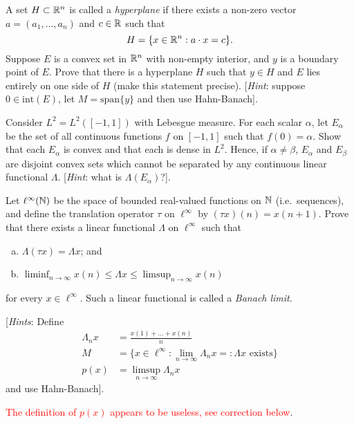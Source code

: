 \begin{exercise}
	A set $H \subset \mathbb{R}^n$ is called a \emph{hyperplane} if there exists a non-zero vector $a = (a_1, \ldots, a_n)$ and $c \in \mathbb{R}$ such that
	\begin{equation*}
		H = \{ x \in \mathbb{R}^n : a \cdot x = c\}.
	\end{equation*}
	Suppose $E$ is a convex set in $\mathbb{R}^n$ with non-empty interior, and $y$ is a boundary point of $E$. Prove that there is a hyperplane $H$ such that $y\in H$ and $E$ lies entirely on one side of $H$ (make this statement precise). [\emph{Hint}: suppose $0 \in \text{int}(E)$, let $M = \text{span}\{y\}$ and then use Hahn-Banach].
\end{exercise}

\begin{exercise}
	Consider $L^2 = L^2([-1,1])$ with Lebesgue measure. For each scalar $\alpha$, let $E_\alpha$ be the set of all continuous functions $f$ on $[-1,1]$ such that $f(0) = \alpha$. Show that each $E_\alpha$ is convex and that each is dense in $L^2$. Hence, if $\alpha \ne \beta$, $E_\alpha$ and $E_\beta$ are disjoint convex sets which cannot be separated by any continuous linear functional $\Lambda$. [\emph{Hint}: what is $\Lambda(E_\alpha)$?].
\end{exercise}

\begin{exercise}[Ex.\ 4]
	Let $\ell^\infty(\mathbb{N})$ be the space of bounded real-valued functions on $\mathbb{N}$ (i.e.\ sequences), and define the translation operator $\tau$ on $\ell^\infty$ by $(\tau x)(n) = x(n+1)$. Prove that there exists a linear functional $\Lambda$ on $\ell^\infty$ such that
	\begin{enumerate}[(a)]
		\item $\Lambda (\tau x) = \Lambda x$; and
		\item $\displaystyle\liminf_{n\to\infty} x(n) \le \Lambda x \le \displaystyle\limsup_{n\to\infty} x(n)$
	\end{enumerate}
	for every $x \in \ell^\infty$. Such a linear functional is called a \emph{Banach limit}.
	
	[\emph{Hints}: Define
	\begin{align*}
		\Lambda_n x &= \frac{x(1)+\ldots+x(n)}{n} \\
		M &= \{ x \in \ell^\infty : \lim_{n\to\infty} \Lambda_n x =: \Lambda x \text{ exists}\} \\
		p(x) &= \limsup_{n\to\infty} \Lambda_n x
	\end{align*}
	and use Hahn-Banach].
\end{exercise}
\textcolor{red}{The definition of $p(x)$ appears to be useless, see correction below}.

